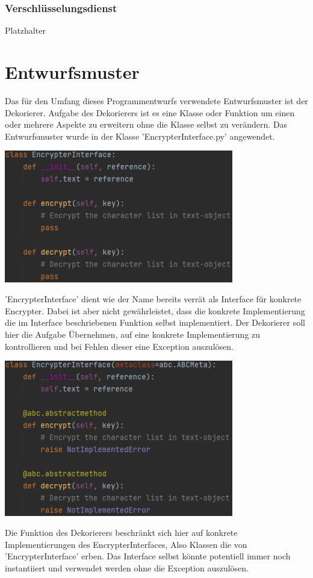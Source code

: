 \documentclass[12pt]{article}
\begin{document}
\subsubsection{Verschlüsselungsdienst}
Platzhalter

\newpage

\section{Entwurfsmuster}
Das für den Umfang dieses Programmentwurfs verwendete Entwurfsmuster ist der Dekorierer. Aufgabe des Dekorierers ist es eine Klasse oder Funktion um einen oder mehrere Aspekte zu erweitern ohne die Klasse selbst zu verändern. Das Entwurfsmuster wurde in der Klasse 'EncrypterInterface.py' angewendet.
\begin{center}
	\includegraphics[width=10cm]{bilder/Decorator_before.png}
\end{center}
'EncrypterInterface' dient wie der Name bereits verrät als Interface für konkrete Encrypter. Dabei ist aber nicht gewährleistet, dass die konkrete Implementierung die im Interface beschriebenen Funktion selbst implementiert. Der Dekorierer soll hier die Aufgabe Übernehmen, auf eine konkrete Implementierung zu kontrollieren und bei Fehlen dieser eine Exception auszulösen.
\begin{center}
	\includegraphics[width=10cm]{bilder/Decorator_after.png}
\end{center}
Die Funktion des Dekorierers beschränkt sich hier auf konkrete Implementierungen des EncrypterInterfaces, Also Klassen die von 'EncrypterInterface' erben. Das Interface selbst könnte potentiell immer noch instantiiert und verwendet werden ohne die Exception auszulösen.
\end{document}
